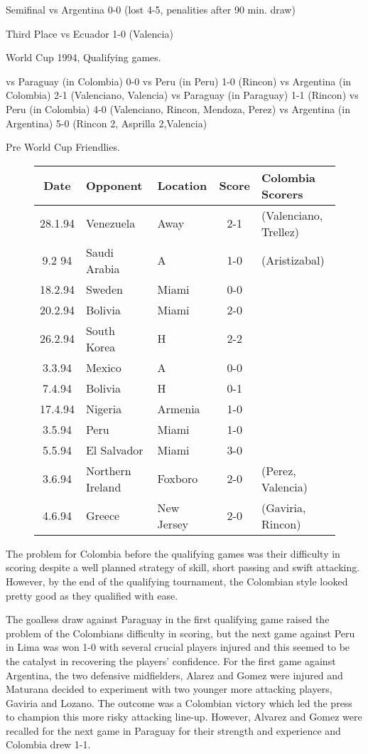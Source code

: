 Semifinal
vs Argentina   0-0 (lost 4-5, penalities after 90 min. draw)
 
Third Place
vs Ecuador     1-0 (Valencia)
 
 
World Cup 1994, Qualifying games.
 
vs Paraguay (in Colombia) 0-0
vs Peru (in Peru) 1-0  (Rincon)
vs Argentina (in Colombia) 2-1  (Valenciano, Valencia)
vs Paraguay (in Paraguay)  1-1  (Rincon)
vs Peru (in Colombia)  4-0  (Valenciano, Rincon, Mendoza, Perez)
vs Argentina (in Argentina) 5-0  (Rincon 2, Asprilla 2,Valencia)
 
Pre World Cup Friendlies.
\begin{figure}[H]
\begin{tabular}{c l l c l}
Date & Opponent & Location & Score & Colombia Scorers \\ \hline
28.1.94 & Venezuela & Away & 2-1 & (Valenciano, Trellez) \\
9.2 94 & Saudi Arabia & A & 1-0 & (Aristizabal) \\
18.2.94 & Sweden & Miami & 0-0 & \\
20.2.94 & Bolivia & Miami & 2-0 & \\
26.2.94 & South Korea & H & 2-2 & \\
 3.3.94 & Mexico & A & 0-0 & \\
 7.4.94 & Bolivia & H & 0-1 & \\
17.4.94 & Nigeria & Armenia & 1-0 & \\
 3.5.94 & Peru & Miami & 1-0 & \\
 5.5.94 & El Salvador & Miami & 3-0 & \\
 3.6.94 & Northern Ireland & Foxboro & 2-0 & (Perez, Valencia) \\
 4.6.94 & Greece & New Jersey & 2-0 & (Gaviria, Rincon) \\ \hline
\end{tabular}
\end{figure}
The problem for Colombia before the qualifying games was their difficulty in
scoring despite a well planned strategy of skill, short passing and swift
attacking. However, by the end of the qualifying tournament, the Colombian
style looked pretty good as they qualified with ease.

The goalless draw against Paraguay in the first qualifying game raised the 
problem of the Colombians difficulty in scoring, but the next game against Peru
in Lima was won 1-0 with several crucial players injured and this seemed to be 
the catalyst in recovering the players' confidence. For the first game against
Argentina, the two defensive midfielders, Alarez and Gomez were injured and
Maturana decided to experiment with two younger more attacking players, Gaviria
and Lozano. The outcome was a Colombian victory which led the press to champion
this more risky attacking line-up. However, Alvarez and Gomez were recalled for 
the next game in Paraguay for their strength and experience and Colombia drew
1-1.

